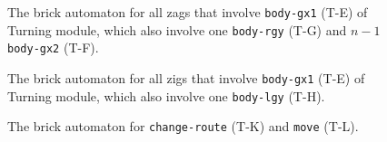 \documentclass[runningheads]{llncs}
\begin{document}
\begin{figure}[ht]
\centering
\caption{The brick automaton for all zags that involve \texttt{body-gx1} (T-E) of Turning module, which also involve one \texttt{body-rgy} (T-G) and $n-1$ \texttt{body-gx2} (T-F).}
\label{fig:BA_gx_right}
\end{figure}

\begin{figure}[ht]
\centering
\caption{The brick automaton for all zigs that involve \texttt{body-gx1} (T-E) of Turning module, which also involve one \texttt{body-lgy} (T-H).}
\label{fig:BA_gx_left}
\end{figure}

\begin{figure}[ht]
\centering
\caption{The brick automaton for \texttt{change-route} (T-K) and \texttt{move} (T-L).}
\label{fig:BA_move}
\end{figure}
\end{document}
